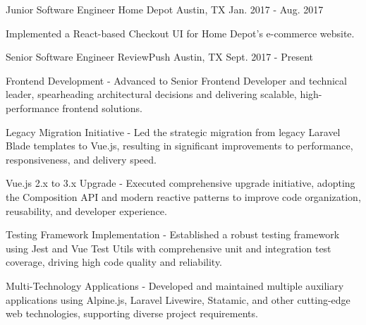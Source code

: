 \begin{cventries}
    \cventry
    {Junior Software Engineer} %
    {Home Depot} %
    {Austin, TX} %
    {Jan. 2017 - Aug. 2017} %
    {
        \vspace{-4mm}
        \begin{cvitems} %
            \item {Implemented a React-based Checkout UI for Home Depot's e-commerce website.}
        \end{cvitems}
    }
    \cventry
    {Senior Software Engineer} %
    {ReviewPush} %
    {Austin, TX} %
    {Sept. 2017 - Present} %
    {
        \vspace{-4mm}
        \begin{cvitems} %
            \item {Frontend Development - Advanced to Senior Frontend Developer and technical leader, spearheading architectural decisions and delivering scalable, high-performance frontend solutions.}
        \end{cvitems}
        \begin{cvsubitems}
            \item {Legacy Migration Initiative - Led the strategic migration from legacy Laravel Blade templates to Vue.js, resulting in significant improvements to performance, responsiveness, and delivery speed.}
            \item {Vue.js 2.x to 3.x Upgrade - Executed comprehensive upgrade initiative, adopting the Composition API and modern reactive patterns to improve code organization, reusability, and developer experience.}
            \item {Testing Framework Implementation - Established a robust testing framework using Jest and Vue Test Utils with comprehensive unit and integration test coverage, driving high code quality and reliability.}
            \item {Multi-Technology Applications - Developed and maintained multiple auxiliary applications using Alpine.js, Laravel Livewire, Statamic, and other cutting-edge web technologies, supporting diverse project requirements.}

\end{cvsubitems}}
\end{cventries}
